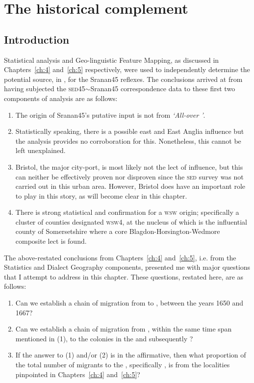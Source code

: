 \chapter{The historical complement}\label{ch:6}

\section{Introduction}\label{6.1}
Statistical analysis and Geo-linguistic Feature Mapping, as discussed in Chapters~\ref{ch:4} and~\ref{ch:5} respectively, were used to independently determine the potential source, in , for the Sranan45 reflexes. The conclusions arrived at from having subjected the \textsc{sed45}$\sim$Sranan45 correspondence data to these first two components of analysis are as follows:

\renewcommand{\labelenumii}{\theenumi}
\begin{enumerate}
\item {The origin of Sranan45's putative input is not from \emph{`All-over '}.}
\item  {Statistically speaking, there is a possible east and East Anglia influence but the  analysis provides no corroboration for this. Nonetheless, this cannot be left unexplained.}
\item {Bristol, the major city-port, is most likely not the lect of influence, but this can neither be effectively proven nor disproven since the \textsc{sed} survey was not carried out in this urban area. However, Bristol does have an important role to play in this story, as will become clear in this chapter.}
\item {There is strong statistical and  confirmation for a \textsc{wsw}  origin; specifically a cluster of counties designated  \textsc{wsw4}, at the nucleus of which is the influential county of Somersetshire where a core Blagdon-Horsington-Wedmore composite lect is found.}
\end{enumerate}

The above-restated conclusions from Chapters~\ref{ch:4} and~\ref{ch:5}, i.e. from the Statistics and Dialect Geography components, presented me with major questions that I attempt to address in this chapter. These questions, restated here, are as follows:


\begin{enumerate}
\item Can we establish a chain of migration from  to , between the years 1650 and 1667?
\item Can we establish a chain of migration from , within the same time span mentioned in (1), to the  colonies in the  and subsequently ?
\item If the answer to (1) and/or (2) is in the affirmative, then what proportion of the total number of migrants to the , specifically , is from the localities pinpointed in Chapters~\ref{ch:4} and~\ref{ch:5}?
\end{enumerate}

